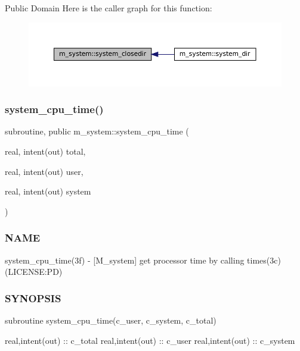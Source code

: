 Public Domain Here is the caller graph for this function\+:\nopagebreak
\begin{figure}[H]
\begin{center}
\leavevmode
\includegraphics[width=350pt]{namespacem__system_acd442b52c64fc50482bc08b0ac8a50d1_icgraph}
\end{center}
\end{figure}
\mbox{\label{namespacem__system_a257d2b8987db850bc686507f19ccbe4a}} 
\subsubsection{\texorpdfstring{system\+\_\+cpu\+\_\+time()}{system\_cpu\_time()}}
{\footnotesize\ttfamily subroutine, public m\+\_\+system\+::system\+\_\+cpu\+\_\+time (\begin{DoxyParamCaption}\item[{real, intent(out)}]{total,  }\item[{real, intent(out)}]{user,  }\item[{real, intent(out)}]{system }\end{DoxyParamCaption})}



\subsubsection*{N\+A\+ME}

system\+\_\+cpu\+\_\+time(3f) -\/ \mbox{[}M\+\_\+system\mbox{]} get processor time by calling times(3c) (L\+I\+C\+E\+N\+SE\+:PD) 

\subsubsection*{S\+Y\+N\+O\+P\+S\+IS}

\begin{DoxyVerb}    subroutine system_cpu_time(c_user, c_system, c_total)

     real,intent(out) :: c_total
     real,intent(out) :: c_user
     real,intent(out) :: c_system
\end{DoxyVerb}


